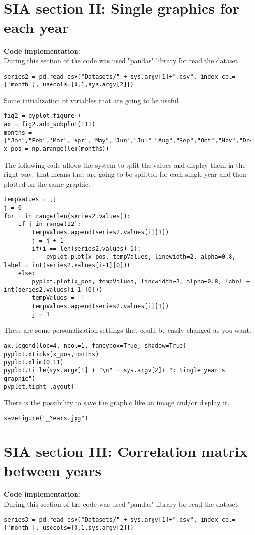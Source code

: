 \section{SIA section II: Single graphics for each year}
\label{SIA_section_II}
\textbf{Code implementation:}\\
During this section of the code was used "pandas" library for read the dataset.
\begin{lstlisting}
series2 = pd.read_csv("Datasets/" + sys.argv[1]+".csv", index_col=['month'], usecols=[0,1,sys.argv[2]])
\end{lstlisting}

Some initialization of variables that are going to be useful.
\begin{lstlisting}
fig2 = pyplot.figure()
ax = fig2.add_subplot(111)
months = ["Jan","Feb","Mar","Apr","May","Jun","Jul","Aug","Sep","Oct","Nov","Dec"]
x_pos = np.arange(len(months))
\end{lstlisting}

The following code allows the system to split the values and display them in the right way: that means that are going to be splitted for each single year and then plotted on the same graphic.
\begin{lstlisting}
tempValues = []
j = 0
for i in range(len(series2.values)):
	if j in range(12):
		tempValues.append(series2.values[i][1])
		j = j + 1
		if(i == len(series2.values)-1):
			pyplot.plot(x_pos, tempValues, linewidth=2, alpha=0.8, label = int(series2.values[i-1][0]))
	else:
		pyplot.plot(x_pos, tempValues, linewidth=2, alpha=0.8, label = int(series2.values[i-1][0]))
		tempValues = []
		tempValues.append(series2.values[i][1])
		j = 1
\end{lstlisting}

These are some personalization settings that could be easily changed as you want.
\begin{lstlisting}
ax.legend(loc=4, ncol=1, fancybox=True, shadow=True)
pyplot.xticks(x_pos,months)
pyplot.xlim(0,11)
pyplot.title(sys.argv[1] + "\n" + sys.argv[2]+ ": Single year's graphic")
pyplot.tight_layout()
\end{lstlisting}

There is the possibility to save the graphic like an image and/or display it.
\begin{lstlisting}
saveFigure("_Years.jpg")
\end{lstlisting}


\section{SIA section III: Correlation matrix between years}
\label{SIA_section_III}
\textbf{Code implementation:}\\
During this section of the code was used "pandas" library for read the dataset.
\begin{lstlisting}
series3 = pd.read_csv("Datasets/" + sys.argv[1]+".csv", index_col=['month'], usecols=[0,1,sys.argv[2]])
\end{lstlisting}

